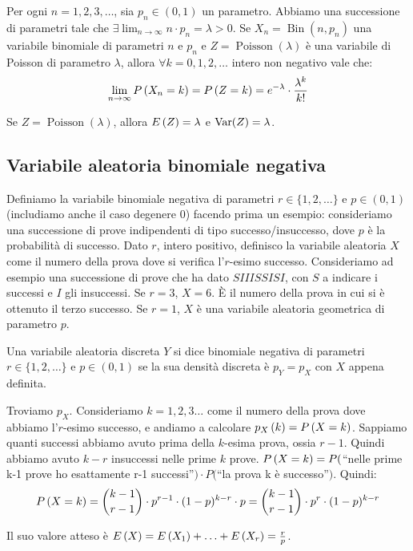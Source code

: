 \begin{prop}
Per ogni $n = 1, 2, 3, \dots$, sia $p_n \in (0,1)$ un parametro. Abbiamo una successione di parametri tale che $\exists \lim_{n \to \infty} n \cdot p_n = \lambda > 0$. Se $X_n = \operatorname{Bin}(n, p_n)$ una variabile binomiale di parametri $n$ e $p_n$ e $Z = \operatorname{Poisson}(\lambda)$ \`e una variabile di Poisson di parametro $\lambda$, allora $\forall k = 0, 1, 2, \dots$ intero non negativo vale che:
\[
\lim_{n \to \infty} P \left( {X_n = k} \right) = P \left( {Z = k} \right) = e^{-\lambda} \cdot \frac{\lambda^k}{k!}
\]
\end{prop}

\begin{fact}
Se $Z = \operatorname{Poisson}(\lambda)$, allora $E \left( Z \right) = \lambda$ e $\operatorname{Var} (Z) = \lambda$.
\end{fact}

\subsection{Variabile aleatoria binomiale negativa}

\begin{defn}
Definiamo la variabile binomiale negativa di parametri $r \in \{ 1, 2, \dots \}$ e $p \in (0,1)$ (includiamo anche il caso degenere 0) facendo prima un esempio: consideriamo una successione di prove indipendenti di tipo successo/insuccesso, dove $p$ \`e la probabilit\`a di successo. Dato $r$, intero positivo, definisco la variabile aleatoria $X$ come il numero della prova dove si verifica l'$r$-esimo successo. Consideriamo ad esempio una successione di prove che ha dato $SIIISSISI$, con $S$ a indicare i successi e $I$ gli insuccessi. Se $r = 3$, $X = 6$. \`E il numero della prova in cui si \`e ottenuto il terzo successo. Se $r = 1$, $X$ \`e una variabile aleatoria geometrica di parametro $p$.

Una variabile aleatoria discreta $Y$ si dice binomiale negativa di parametri $r \in \{ 1, 2, \dots \}$ e $p \in (0,1)$ se la sua densit\`a discreta \`e $p_Y = p_X$ con $X$ appena definita.

Troviamo $p_X$. Consideriamo $k = 1, 2, 3 \dots$ come il numero della prova dove abbiamo l'$r$-esimo successo, e andiamo a calcolare $p_{X} \left( k \right) = P \left( {X = k} \right)$. Sappiamo quanti successi abbiamo avuto prima della $k$-esima prova, ossia $r-1$. Quindi abbiamo avuto $k-r$ insuccessi nelle prime $k$ prove. $P \left( {X = k} \right) = P($``nelle prime k-1 prove ho esattamente r-1 successi''$) \cdot P($``la prova k \`e successo''$)$. Quindi:
\[
P \left( {X = k} \right) = \binom{k-1}{r-1} \cdot p^{r-1} \cdot (1 - p)^{k - r} \cdot p = 
\binom{k-1}{r-1} \cdot p^r \cdot (1-p)^{k - r}
\]
\end{defn}
Il suo valore atteso \`e $E \left( X \right) = E \left( X_1 \right) + \ldots + E \left( X_r \right) = \frac{r}{p}$.


